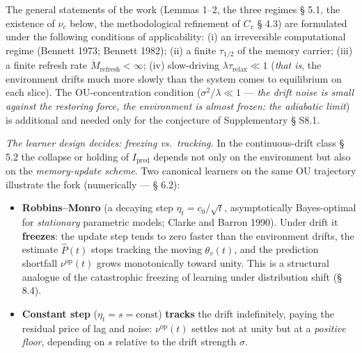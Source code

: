 \documentclass[pdflatex,sn-mathphys-ay]{sn-jnl}
\providecommand{\tightlist}{\setlength{\itemsep}{0pt}\setlength{\parskip}{0pt}}
\begin{document}
The general statements of the work (Lemmas 1--2, the three regimes § 5.1, the existence of \(\nu_c\) below, the methodological refinement of \(C_v\) § 4.3) are formulated under the following conditions of applicability: (i) an irreversible computational regime (Bennett 1973; Bennett 1982); (ii) a finite \(\tau_{1/2}\) of the memory carrier; (iii) a finite refresh rate \(\dot{M}_{\text{refresh}} < \infty\); (iv) slow-driving \(\lambda \tau_{\text{relax}} \ll 1\) (\emph{that is}, the environment drifts much more slowly than the system comes to equilibrium on each slice). The OU-concentration condition (\(\sigma^2/\lambda \ll 1\) --- \emph{the drift noise is small against the restoring force, the environment is almost frozen: the adiabatic limit}) is additional and needed only for the conjecture of Supplementary § S8.1.



\emph{The learner design decides: freezing vs.~tracking.} In the continuous-drift class § 5.2 the collapse or holding of \(I_{\text{pred}}\) depends not only on the environment but also on the \emph{memory-update scheme}. Two canonical learners on the same OU trajectory illustrate the fork (numerically --- § 6.2):



\begin{itemize}

\tightlist

\item

  \textbf{Robbins--Monro} (a decaying step \(\eta_t = c_0/\sqrt{t}\), asymptotically Bayes-optimal for \emph{stationary} parametric models; Clarke and Barron 1990). Under drift it \textbf{freezes}: the update step tends to zero faster than the environment drifts, the estimate \(\hat P(t)\) stops tracking the moving \(\theta_v(t)\), and the prediction shortfall \(\nu^{\text{op}}(t)\) grows monotonically toward unity. This is a structural analogue of the catastrophic freezing of learning under distribution shift (§ 8.4).

\item

  \textbf{Constant step} (\(\eta_t = s = \text{const}\)) \textbf{tracks} the drift indefinitely, paying the residual price of lag and noise: \(\nu^{\text{op}}(t)\) settles not at unity but at a \emph{positive floor}, depending on \(s\) relative to the drift strength \(\sigma\).

\end{itemize}
\end{document}
